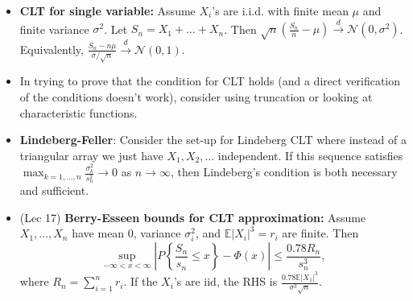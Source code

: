 \documentclass[twoside]{article}
\newcommand{\dis}{\displaystyle}
\newcommand\bbE{\mathbb{E}}
\newcommand\calN{\mathcal{N}}
\newcommand\sg{\sigma}
\newcommand\goesto{\rightarrow}
\begin{document}
\begin{itemize}
\item \textbf{CLT for single variable:} Assume $X_i$'s are i.i.d. with finite mean $\mu$ and finite variance $\sg^2$. Let $S_n = X_1 + \dots + X_n$. Then $\sqrt{n} \left(\dis\frac{S_n}{n} - \mu \right) \stackrel{d}{\goesto} \calN(0, \sg^2)$. Equivalently, $\dis\frac{S_n - n\mu}{\sg / \sqrt{n}} \stackrel{d}{\goesto} \calN(0, 1)$.

\item In trying to prove that the condition for CLT holds (and a direct verification of the conditions doesn't work), consider using truncation or looking at characteristic functions.

\item \textbf{Lindeberg-Feller}: Consider the set-up for Lindeberg CLT where instead of a triangular array we just have $X_1, X_2, \dots$ independent. If this sequence satisfies $\displaystyle\max_{k = 1, \dots, n}\frac{\sg_k^2}{s_n^2} \goesto 0$ as $n \goesto \infty$, then Lindeberg's condition is both necessary and sufficient.

\item (Lec 17) \textbf{Berry-Esseen bounds for CLT approximation:} Assume $X_1, \dots, X_n$ have mean $0$, variance $\sg_i^2$, and $\bbE |X_i|^3 = r_i$ are finite. Then
\begin{equation*} \sup_{-\infty < x < \infty} \left| P \left\{\frac{S_n}{s_n} \leq x \right\} - \Phi(x)\right| \leq \frac{0.78R_n}{s_n^3}, \end{equation*}
where $R_n = \sum_{i=1}^n r_i$. If the $X_i$'s are iid, the RHS is $\dis\frac{0.78 \bbE |X_1|^3}{\sg^3 \sqrt{n}}$.

\end{itemize}

\end{document}
